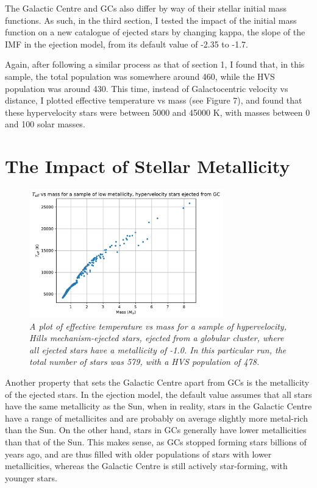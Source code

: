 \documentclass{article}
\begin{document}
The Galactic Centre and GCs also differ by way of their stellar initial mass functions. As such, in the third section, I tested the impact of the initial mass function on a new catalogue of ejected stars by changing kappa, the slope of the IMF in the ejection model, from its default value of -2.35 to -1.7.

Again, after following a similar process as that of section 1, I found that, in this sample, the total population was somewhere around 460, while the HVS population was around 430. This time, instead of Galactocentric velocity vs distance, I plotted effective temperature vs mass (see Figure 7), and found that these hypervelocity stars were between 5000 and 45000 K, with masses between 0 and 100 solar masses.

\section{The Impact of Stellar Metallicity}

\begin{figure}[h!]
\caption{\textit{A plot of effective temperature vs mass for a sample of hypervelocity, Hills mechanism-ejected stars, ejected from a globular cluster, where all ejected stars have a metallicity of -1.0. In this particular run, the total number of stars was 579, with a HVS population of 478.}}
\centering
\includegraphics[width=0.75\textwidth]{Teff_vs_mass_hyp_4.pdf}
\end{figure}

Another property that sets the Galactic Centre apart from GCs is the metallicity of the ejected stars. In the ejection model, the default value assumes that all stars have the same metallicity as the Sun, when in reality, stars in the Galactic Centre have a range of metallicites and are probably on average slightly more metal-rich than the Sun. On the other hand, stars in GCs generally have lower metallicities than that of the Sun. This makes sense, as GCs stopped forming stars billions of years ago, and are thus filled with older populations of stars with lower metallicities, whereas the Galactic Centre is still actively star-forming, with younger stars.
\end{document}
